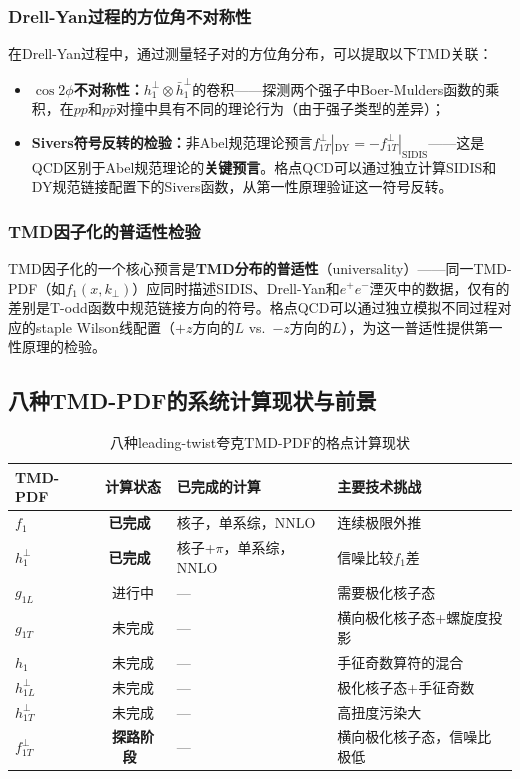 \documentclass[12pt,a4paper]{ctexart}
\theoremstyle{definition}
\begin{document}
\subsubsection{Drell-Yan过程的方位角不对称性}

在Drell-Yan过程中，通过测量轻子对的方位角分布，可以提取以下TMD关联：
\begin{itemize}
    \item \textbf{$\cos 2\phi$不对称性：}$h_1^\perp \otimes \bar{h}_1^\perp$的卷积——探测两个强子中Boer-Mulders函数的乘积，在$pp$和$p\bar{p}$对撞中具有不同的理论行为（由于强子类型的差异）；
    \item \textbf{Sivers符号反转的检验：}非Abel规范理论预言$f_{1T}^\perp|_{\text{DY}} = -f_{1T}^\perp|_{\text{SIDIS}}$——这是QCD区别于Abel规范理论的\textbf{关键预言}。格点QCD可以通过独立计算SIDIS和DY规范链接配置下的Sivers函数，从第一性原理验证这一符号反转。
\end{itemize}

\subsubsection{TMD因子化的普适性检验}

TMD因子化的一个核心预言是\textbf{TMD分布的普适性}（universality）——同一TMD-PDF（如$f_1(x, k_\perp)$）应同时描述SIDIS、Drell-Yan和$e^+e^-$湮灭中的数据，仅有的差别是T-odd函数中规范链接方向的符号。格点QCD可以通过独立模拟不同过程对应的staple Wilson线配置（$+z$方向的$L$ vs.\ $-z$方向的$L$），为这一普适性提供第一性原理的检验。

\subsection{八种TMD-PDF的系统计算现状与前景}

\begin{table}[H]
\centering
\caption{八种leading-twist夸克TMD-PDF的格点计算现状}
\label{tab:TMD_status}
\begin{tabular}{lcp{4cm}p{5cm}}
\toprule
TMD-PDF & 计算状态 & 已完成的计算 & 主要技术挑战 \\
\midrule
$f_1$ & \textbf{已完成}~\cite{He2024unpolTMD} & 核子，单系综，NNLO & 连续极限外推 \\
$h_1^\perp$ & \textbf{已完成}~\cite{Ma2025BoerMulders} & 核子+$\pi$，单系综，NNLO & 信噪比较$f_1$差 \\
$g_{1L}$ & 进行中 & — & 需要极化核子态 \\
$g_{1T}$ & 未完成 & — & 横向极化核子态+螺旋度投影 \\
$h_1$ & 未完成 & — & 手征奇数算符的混合 \\
$h_{1L}^\perp$ & 未完成 & — & 极化核子态+手征奇数 \\
$h_{1T}^\perp$ & 未完成 & — & 高扭度污染大 \\
$f_{1T}^\perp$ & \textbf{探路阶段}~\cite{Ma2025BoerMulders} & — & 横向极化核子态，信噪比极低 \\
\bottomrule
\end{tabular}
\end{table}
\end{document}
